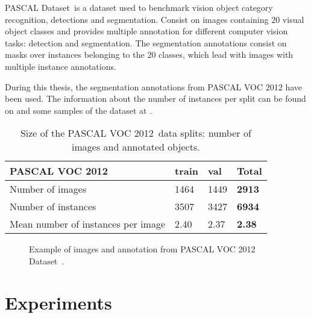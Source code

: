 PASCAL Dataset~\pascal is a dataset used to benchmark vision object category recognition, detections and segmentation.
Consist on images containing 20 visual object classes and provides multiple annotation for different computer vision tasks: detection and segmentation.
The segmentation annotations consist on masks over instances belonging to the 20 classes, which lead with images with multiple instance annotations.

During this thesis, the segmentation annotations from PASCAL VOC 2012 have been used. The information about the number of instances per split can be found on  and some samples of the dataset at .

\begin{table}[h]
  \centering
  \begin{tabular}{l|ll|l}
  \toprule
  PASCAL VOC 2012                    & train & val  & \textbf{Total} \\
  \midrule
  Number of images                   & 1464  & 1449 & \textbf{2913}  \\
  Number of instances                & 3507  & 3427 & \textbf{6934}  \\
  Mean number of instances per image & 2.40  & 2.37 & \textbf{2.38}  \\
  \bottomrule
  \end{tabular}
  \caption{Size of the PASCAL VOC 2012~\pascal data splits: number of images and annotated objects.}
  \label{tab:pascal}
\end{table}


\begin{figure}[h]
  \centering
  \caption{Example of images and annotation from PASCAL VOC 2012 Dataset~\pascal.}
  \label{fig:pascal}
\end{figure}



\section{Experiments}

